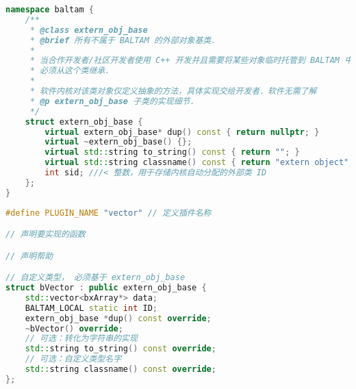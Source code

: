 
\begin{issues}
\issueDraft
\end{issues}

\begin{lstlisting}[language=cpp, caption=extern\_obj.h节选]
namespace baltam {
    /**
     * @class extern_obj_base
     * @brief 所有不属于 BALTAM 的外部对象基类．
     *
     * 当合作开发者/社区开发者使用 C++ 开发并且需要将某些对象临时托管到 BALTAM 中时，
     * 必须从这个类继承．
     *
     * 软件内核对该类对象仅定义抽象的方法，具体实现交给开发者．软件无需了解
     * @p extern_obj_base 子类的实现细节．
     */
    struct extern_obj_base {
        virtual extern_obj_base* dup() const { return nullptr; }
        virtual ~extern_obj_base() {};
        virtual std::string to_string() const { return ""; }
        virtual std::string classname() const { return "extern object"; };
        int sid; ///< 整数，用于存储内核自动分配的外部类 ID
    };
}
\end{lstlisting}


\begin{lstlisting}[language=cpp,caption=vector 插件的 main.cpp]
#define PLUGIN_NAME "vector" // 定义插件名称

// 声明要实现的函数

// 声明帮助

// 自定义类型， 必须基于 extern_obj_base
struct bVector : public extern_obj_base {
    std::vector<bxArray*> data;
    BALTAM_LOCAL static int ID;
    extern_obj_base *dup() const override;
    ~bVector() override;
    // 可选：转化为字符串的实现
    std::string to_string() const override;
    // 可选：自定义类型名字
    std::string classname() const override;
};
\end{lstlisting}